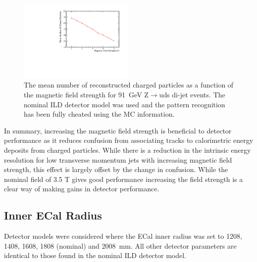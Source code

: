 \begin{figure}[h!]
\includegraphics[width=0.5\textwidth]{OptimisationStudies/Plots/Description/BField/BFieldNumbers_91GeV_Z_uds.pdf}
\caption[The mean number of reconstructed charged particles as a function of the magnetic field strength for 91~GeV Z$\rightarrow$uds di-jet events.  The nominal ILD detector model was used and the pattern recognition has been fully cheated using the MC information.]{The mean number of reconstructed charged particles as a function of the magnetic field strength for 91~GeV Z$\rightarrow$uds di-jet events.  The nominal ILD detector model was used and the pattern recognition has been fully cheated using the MC information.}
\label{fig:bfieldchargedparticles}
\end{figure}

In summary, increasing the magnetic field strength is beneficial to detector performance as it reduces confusion from associating tracks to calorimetric energy deposits from charged particles.  While there is a reduction in the intrinsic energy resolution for low transverse momentum jets with increasing magnetic field strength, this effect is largely offset by the change in confusion.  While the nominal field of 3.5 T gives good performance increasing the field strength is a clear way of making gains in detector performance.


\subsection{Inner ECal Radius}
Detector models were considered where the ECal inner radius was set to 1208, 1408, 1608, 1808 (nominal) and 2008~mm.  All other detector parameters are identical to those found in the nominal ILD detector model.

